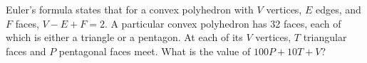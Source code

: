 Euler's formula states that for a convex polyhedron with $V$ vertices, $E$ edges, and $F$ faces, $V - E + F = 2$.  A particular convex polyhedron has 32 faces, each of which is either a triangle or a pentagon.  At each of its $V$ vertices, $T$ triangular faces and $P$ pentagonal faces meet.  What is the value of $100P + 10T + V$?